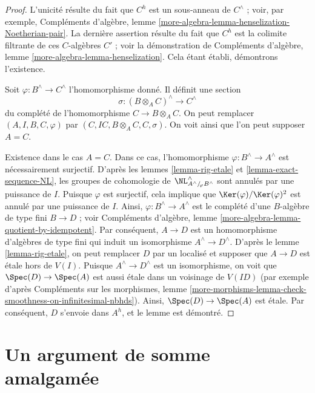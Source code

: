 \begin{proof}
L'unicité résulte du fait que $C^h$ est un sous-anneau de $C^\wedge$ ; voir,
par exemple, Compléments d'algèbre, lemme
\ref{more-algebra-lemma-henselization-Noetherian-pair}. La dernière assertion
résulte du fait que $C^h$ est la colimite filtrante de ces $C$-algèbres $C'$ ;
voir la démonstration de Compléments d'algèbre, lemme
\ref{more-algebra-lemma-henselization}. Cela étant établi, démontrons
l'existence.

\medskip\noindent
Soit $\varphi : B^\wedge \to C^\wedge$ l'homomorphisme donné. Il définit une
section
$$
\sigma : (B \otimes_A C)^\wedge \longrightarrow C^\wedge
$$
du complété de l'homomorphisme $C \to B \otimes_A C$. On peut remplacer
$(A, I, B, C, \varphi)$ par $(C, IC, B \otimes_A C, C, \sigma)$. On voit
ainsi que l'on peut supposer $A = C$.

\medskip\noindent
Existence dans le cas $A = C$. Dans ce cas, l'homomorphisme
$\varphi : B^\wedge \to A^\wedge$ est nécessairement surjectif. D'après les
lemmes \ref{lemma-rig-etale} et \ref{lemma-exact-sequence-NL}, les groupes de
cohomologie de
$\NL_{A^\wedge/\!_\varphi B^\wedge}^\wedge$
sont annulés par une puissance de $I$. Puisque $\varphi$ est surjectif, cela
implique que $\Ker(\varphi)/\Ker(\varphi)^2$ est annulé par une puissance de
$I$. Ainsi, $\varphi : B^\wedge \to A^\wedge$ est le complété d'une
$B$-algèbre de type fini $B \to D$ ; voir Compléments d'algèbre, lemme
\ref{more-algebra-lemma-quotient-by-idempotent}. Par conséquent, $A \to D$ est
un homomorphisme d'algèbres de type fini qui induit un isomorphisme
$A^\wedge \to D^\wedge$. D'après le lemme \ref{lemma-rig-etale}, on peut
remplacer $D$ par un localisé et supposer que $A \to D$ est étale hors de
$V(I)$. Puisque $A^\wedge \to D^\wedge$ est un isomorphisme, on voit que
$\Spec(D) \to \Spec(A)$ est aussi étale dans un voisinage de $V(ID)$ (par
exemple d'après Compléments sur les morphismes, lemme
\ref{more-morphisms-lemma-check-smoothness-on-infinitesimal-nbhds}). Ainsi,
$\Spec(D) \to \Spec(A)$ est étale. Par conséquent, $D$ s'envoie dans $A^h$,
et le lemme est démontré.
\end{proof}
















\section{Un argument de somme amalgamée}
\label{section-approximation}

